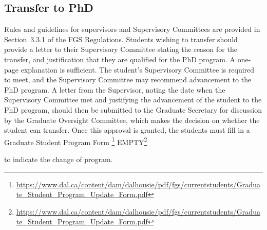 \documentclass[12pt]{article}
\newcommand{\vote}[1]{\color{voteColor}$\ll$#1$\gg$\color{black}\marginpar[$\gg$ vote]{$\ll$ vote}\index{$>>>>$VOTE$<<<<$}}
\newcommand{\parnum}{\arabic{parcount}}
\newcounter{parcount}
\newcommand\p{\stepcounter{parcount}\leavevmode{\raisebox{0.2ex}{\scriptsize[\parnum]}}\hspace{0.2em}}
\newcommand\cp{\setcounter{parcount}{0}}
\newcommand{\furl}[2][EMPTY]%
    {\ifthenelse%
        {\equal{#1}{EMPTY}}%
        {\footnote{\footnotesize{\url{#2}}}}%
        {#1\footnote{\footnotesize{\url{#2}}}}%
    }
\newcommand{\supervisor}{Supervisor\xspace}
\newcommand{\supcom}{Supervisory Committee\xspace}
\newcommand{\gocom}{Graduate Oversight Committee\xspace}
\newcommand{\GS}{Graduate Secretary\xspace}
\newcommand{\fgsregs}{FGS Regulations\xspace}
\begin{document}
%
%
%
%
%
%
%
%
%
%
%

\subsection{\label{sec:transfer_to_phd}Transfer to PhD}

\cp

Rules and guidelines for supervisors and {\supcom}s are provided in
Section~3.3.1 of the \fgsregs.  Students wishing to transfer should provide a
letter to their \supcom stating the reason for the transfer, and justification
that they are qualified for the PhD program. A one-page explanation is
sufficient. The student's \supcom is required to meet, and the \supcom may
recommend advancement to the PhD program.  A letter from the \supervisor,
noting the date when the \supcom met and justifying the advancement of the
student to the PhD program, should then be submitted to the \GS for discussion
by the \gocom, which makes the decision on whether the student can transfer.
Once this approval is granted, the students must fill in a
Graduate Student Program Form\furl{https://www.dal.ca/content/dam/dalhousie/pdf/fgs/currentstudents/Graduate_Student_Program_Update_Form.pdf}
to indicate the change of program.
\end{document}
